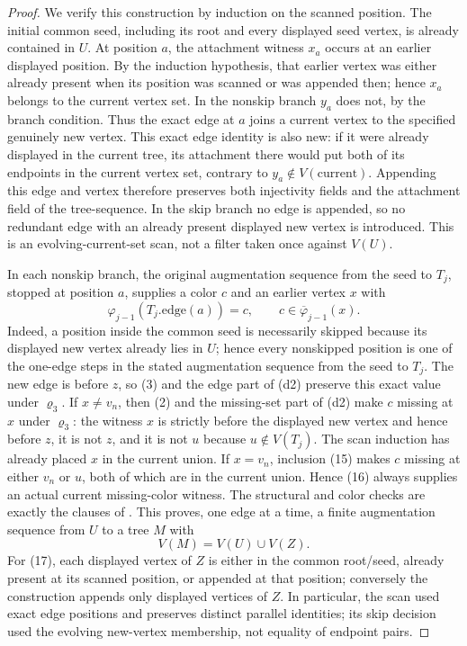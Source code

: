 \begin{proof}
We verify this construction by induction on the scanned position.  The
initial common seed, including its root and every displayed seed vertex, is
already contained in \(U\).  At position \(a\), the attachment witness
\(x_a\) occurs at an earlier displayed position.  By the induction
hypothesis, that earlier vertex was either already present when its position
was scanned or was appended then; hence \(x_a\) belongs to the current
vertex set.  In the nonskip branch \(y_a\) does not, by the branch
condition.  Thus the exact edge at \(a\) joins a current vertex to the
specified genuinely new vertex.  This exact edge identity is also new:
if it were already displayed in the current tree, its attachment there
would put both of its endpoints in the current vertex set, contrary to
\(y_a\notin V(\text{current})\).  Appending this edge and vertex therefore
preserves both injectivity fields and the attachment field of the
tree-sequence.  In the skip branch no edge is appended, so no redundant
edge with an already present displayed new vertex is introduced.  This is
an evolving-current-set scan, not a filter taken once against \(V(U)\).

In each nonskip branch, the original augmentation sequence from the seed
to \(T_j\), stopped at position \(a\), supplies a color \(c\) and an earlier
vertex \(x\) with
\[
 \varphi_{j-1}(T_j.\mathrm{edge}(a))=c,
 \qquad c\in\overline\varphi_{j-1}(x).                      \tag{16}
\]
Indeed, a position inside the common seed is necessarily skipped because
its displayed new vertex already lies in \(U\); hence every nonskipped
position is one of the one-edge steps in the stated augmentation sequence
from the seed to \(T_j\).
The new edge is before \(z\), so (3) and the edge part of (d2) preserve
this exact value under \(\varrho_3\).  If \(x\ne v_n\), then (2) and
the missing-set part of (d2) make \(c\) missing at \(x\) under
\(\varrho_3\): the witness \(x\) is strictly before the displayed new
vertex and hence before \(z\), it is not \(z\), and it is not \(u\) because
\(u\notin V(T_j)\).  The scan induction has already placed \(x\) in the
current union.  If \(x=v_n\), inclusion (15) makes \(c\) missing at either
\(v_n\) or \(u\), both of which are in the current union.  Hence (16)
always supplies an actual current missing-color witness.  The structural
and color checks are exactly the clauses of
.  This proves, one edge at a time, a
finite augmentation sequence from \(U\) to a tree \(M\) with
\[
                 V(M)=V(U)\cup V(Z).                        \tag{17}
\]
For (17), each displayed vertex of \(Z\) is either in the common root/seed,
already present at its scanned position, or appended at that position;
conversely the construction appends only displayed vertices of \(Z\).
In particular, the scan used exact edge positions and preserves distinct
parallel identities; its skip decision used the evolving new-vertex
membership, not equality of endpoint pairs.


\end{proof}
